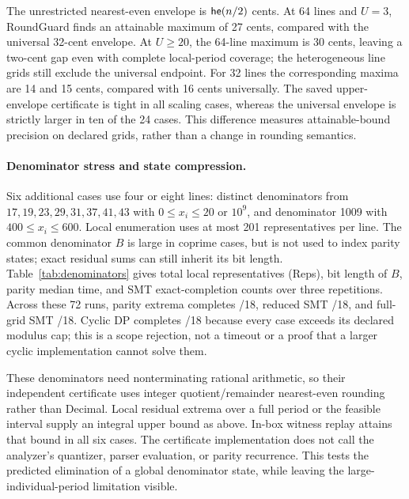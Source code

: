 The unrestricted nearest-even envelope is $\mathsf{he}(n/2)$ cents. At 64 lines and $U=3$, RoundGuard finds an attainable maximum of 27 cents, compared with the universal 32-cent envelope. At $U\ge20$, the 64-line maximum is 30 cents, leaving a two-cent gap even with complete local-period coverage; the heterogeneous line grids still exclude the universal endpoint. For 32 lines the corresponding maxima are 14 and 15 cents, compared with 16 cents universally. The saved upper-envelope certificate is tight in all scaling cases, whereas the universal envelope is strictly larger in ten of the 24 cases. This difference measures attainable-bound precision on declared grids, rather than a change in rounding semantics.


\paragraph{Denominator stress and state compression.}
Six additional cases use four or eight lines: distinct denominators from $17,19,23,29,31,37,41,43$ with $0\le x_i\le20$ or $10^9$, and denominator 1009 with $400\le x_i\le600$. Local enumeration uses at most 201 representatives per line. The common denominator $B$ is large in coprime cases, but is not used to index parity states; exact residual sums can still inherit its bit length. Table~\ref{tab:denominators} gives total local representatives (Reps), bit length of $B$, parity median time, and SMT exact-completion counts over three repetitions. Across these 72 runs, parity extrema completes \DenomDPCompleted/18, reduced SMT \DenomResidueCompleted/18, and full-grid SMT \DenomSMTCompleted/18. Cyclic DP completes \DenomCyclicCompleted/18 because every case exceeds its declared modulus cap; this is a scope rejection, not a timeout or a proof that a larger cyclic implementation cannot solve them.

\begin{table}[ht]
\centering
\caption{Six denominator-stress cases. Short and wide denote upper tick bounds 20 and $10^9$; narrow denotes 400--600. Reduced and Full count established exact optima. Parity extrema completes all repetitions; cyclic DP rejects all cases at its cap.}\label{tab:denominators}
\end{table}

These denominators need nonterminating rational arithmetic, so their independent certificate uses integer quotient/remainder nearest-even rounding rather than Decimal. Local residual extrema over a full period or the feasible interval supply an integral upper bound as above. In-box witness replay attains that bound in all six cases. The certificate implementation does not call the analyzer's quantizer, parser evaluation, or parity recurrence. This tests the predicted elimination of a global denominator state, while leaving the large-individual-period limitation visible.
